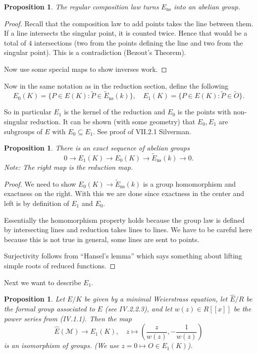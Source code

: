 \documentclass[11pt]{article}
\newcommand{\script}[1]{\mathcal{#1}} %
\newcommand{\st}{\colon}
\newcommand{\ns}{\operatorname{ns}}
\theoremstyle{plain}%
\newtheorem{prop}[thm]{Proposition}
\theoremstyle{definition}
\theoremstyle{remark}
\begin{document}
\begin{prop} %
	The regular composition law turns $E_{\ns}$ into an abelian group.
\end{prop}
\begin{proof}
	Recall that the composition law to add points takes the line between them. If a line intersects the singular point, it is counted twice. Hence that would be a total of $4$ intersections (two from the points defining the line and two from the singular point). This is a contradiction (Bezout's Theorem).

	Now use some special maps to show inverses work.
\end{proof}

Now in the same notation as in the reduction section, define the following
$$
E_0(K) = \{P\in E(K) \st \tilde{P}\in \tilde{E}_{\ns}(k)\}
,\quad
E_1(K) = \{P\in E(K) \st \tilde{P}\in \tilde{O}\}.
$$

So in particular $E_1$ is the kernel of the reduction and $E_0$ is the points with non-singular reduction. It can be shown (with some geometry) that $E_0,E_1$ are subgroups of $E$ with $E_0\subseteq E_1$. See proof of VII.2.1 Silverman.

\begin{prop} %
	There is an exact sequence of abelian groups
	$$
	0 \to E_1(K) \to E_0(K) \to \tilde{E}_{\ns}(k) \to 0.
	$$
	Note: The right map is the reduction map.
\end{prop}
\begin{proof}
	We need to show $E_0(K)\to\tilde{E}_{\ns}(k)$ is a group homomorphism and exactness on the right. With this we are done since exactness in the center and left is by definition of $E_1$ and $E_0$.

	Essentially the homomorphism property holds because the group law is defined by intersecting lines and reduction takes lines to lines. We have to be careful here because this is not true in general, some lines are sent to points.

	Surjectivity follows from ``Hansel's lemma'' which says something about lifting simple roots of reduced functions.
\end{proof}

Next we want to describe $E_1$.

\begin{prop} %
	Let $E/K$ be given by a minimal Weierstrass equation, let $\hat{E}/R$ be the formal group associated to $E$ (see IV.2.2.3), and let $w(z)\in R[[x]]$ be the power series from (IV.1.1). Then the map
	$$
	\hat{E}(\script{M}) \to E_1(K),\quad
	z\mapsto\left(\frac{z}{w(z)},-\frac{1}{w(z)}\right)
	$$
	is an isomorphism of groups. (We use $z=0 \mapsto O\in E_1(K)$).
\end{prop}
\end{document}
